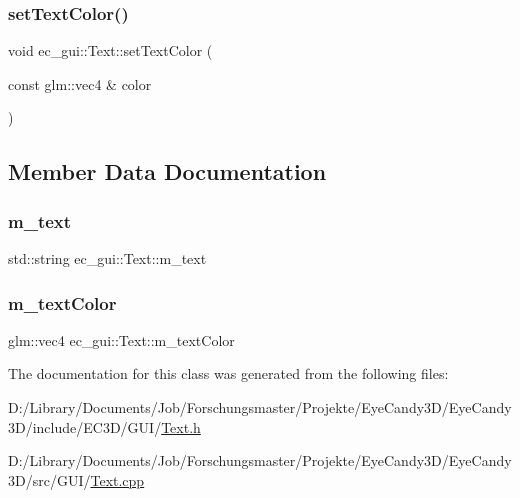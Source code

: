 \subsubsection{\texorpdfstring{set\+Text\+Color()}{setTextColor()}}
{\footnotesize\ttfamily void ec\+\_\+gui\+::\+Text\+::set\+Text\+Color (\begin{DoxyParamCaption}\item[{const glm\+::vec4 \&}]{color }\end{DoxyParamCaption})}



\subsection{Member Data Documentation}
\mbox{\label{classec__gui_1_1_text_a97780a155cc50f0d83fe5149e006b938}} 
\subsubsection{\texorpdfstring{m\+\_\+text}{m\_text}}
{\footnotesize\ttfamily std\+::string ec\+\_\+gui\+::\+Text\+::m\+\_\+text\hspace{0.3cm}{\ttfamily [protected]}}

\mbox{\label{classec__gui_1_1_text_af90729dfed09a3c4c94ed03e5769001e}} 
\subsubsection{\texorpdfstring{m\+\_\+text\+Color}{m\_textColor}}
{\footnotesize\ttfamily glm\+::vec4 ec\+\_\+gui\+::\+Text\+::m\+\_\+text\+Color\hspace{0.3cm}{\ttfamily [protected]}}



The documentation for this class was generated from the following files\+:\begin{DoxyCompactItemize}
\item 
D\+:/\+Library/\+Documents/\+Job/\+Forschungsmaster/\+Projekte/\+Eye\+Candy3\+D/\+Eye\+Candy3\+D/include/\+E\+C3\+D/\+G\+U\+I/\mbox{\hyperlink{_text_8h}{Text.\+h}}\item 
D\+:/\+Library/\+Documents/\+Job/\+Forschungsmaster/\+Projekte/\+Eye\+Candy3\+D/\+Eye\+Candy3\+D/src/\+G\+U\+I/\mbox{\hyperlink{_text_8cpp}{Text.\+cpp}}\end{DoxyCompactItemize}
